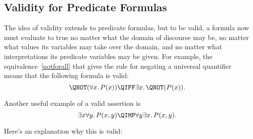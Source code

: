 \iffalse
Logicians have worked very hard to define strict rules for the
use of logic notation so that ideas can be expressed with absolute rigor.
It's all quite charming and clever.  However, the sad irony is that
applied mathematicans usually use their beloved notation as a crude
shorthand, breaking the rules and abusing the notation willy-nilly---sort
of like pounding nails with fine china.
\fi

\subsection{Validity for Predicate Formulas}

\iffalse
A propositional formula is called \emph{valid} when it evaluates to \true\
no matter what truth values are assigned to the individual propositional
variables.  For example, the propositional version of the \idx{Distributive Law}
is that $P \QAND (Q \QOR R)$ is equivalent to $(P \QAND Q) \QOR (P \QAND
R)$.  This is the same as saying that
\[
[P \QAND (Q \QOR R)] \QIFF [(P \QAND Q) \QOR (P \QAND R)]
\]
is valid.
\fi

The idea of validity  extends to predicate
formulas, but to be valid, a formula now must evaluate to true no
matter what the domain of discourse may be, no matter what values its
variables may take over the domain, and no matter what interpretations
its predicate variables may be given.  For example, the
equivalence~\eqref{notforall} that gives the rule for negating a
universal quantifier means that the following formula is valid:
\begin{equation}\label{notforall-equiv}
\QNOT(\forall x.\, P(x)) 
\QIFF  
\exists x.\, \QNOT(P(x)).
\end{equation}

Another useful example of a valid assertion is
\begin{equation}\label{eaimpliesae}
\exists x \forall y.\, P(x,y) \QIMP \forall y \exists x.\, P(x,y).
\end{equation}

Here's an explanation why this is valid:

